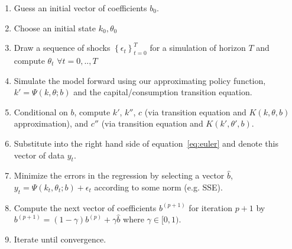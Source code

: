 \documentclass[11pt]{article}%
\begin{document}
\begin{enumerate}
	\item Guess an initial vector of coefficients $b_0$.
	\item Choose an initial state $k_0, \theta_0$
	\item Draw a sequence of shocks $\left\{\epsilon_t\right\}_{t=0}^T$ for a simulation of horizon $T$ and compute $\theta_t \,\, \forall t=0,..,T$
	\item Simulate the model forward using our approximating policy function, $k' = \Psi(k,\theta;b)$ and the capital/consumption transition equation.
	\item Conditional on $b$, compute $k'$, $k''$, $c$ (via transition equation and $K(k,\theta,b)$ approximation), and $c''$ (via transition equation and $K(k',\theta',b)$.
	\item Substitute into the right hand side of equation~\ref{eq:euler} and denote this vector of data $y_t$.
	\item Minimize the errors in the regression by selecting a vector $\hat{b}$, $y_t = \Psi(k_t,\theta_t;b) + \epsilon_t$ according to some norm (e.g. SSE).
	\item Compute the next vector of coefficients $b^{(p+1)}$ for iteration $p+1$ by $b^{(p+1)} = (1-\gamma) b^{(p)} + \gamma \hat{b}$ where $\gamma \in [0,1).$
	\item Iterate until convergence.
\end{enumerate}
\end{document}
